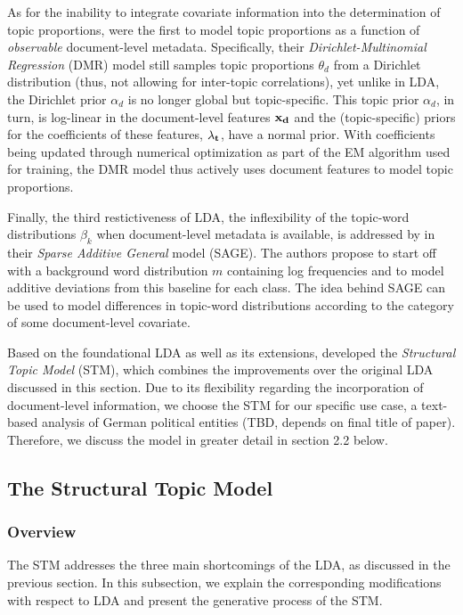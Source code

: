 \documentclass[12pt]{article}
\begin{document}
As for the inability to integrate covariate information into the determination of topic proportions, \cite{mimno2011optimizing} were the first to model topic proportions as a function of \textit{observable} document-level metadata. Specifically, their \textit{Dirichlet-Multinomial Regression} (DMR) model still samples topic proportions $\theta_d$ from a Dirichlet distribution (thus, not allowing for inter-topic correlations), yet unlike in LDA, the Dirichlet prior $\alpha_d$ is no longer global but topic-specific. This topic prior $\alpha_d$, in turn, is log-linear in the document-level features $\bf{x_d}$ and the (topic-specific) priors for the coefficients of these features, $\bf{\lambda_t}$, have a normal prior. With coefficients being updated through numerical optimization as part of the EM algorithm used for training, the DMR model thus actively uses document features to model topic proportions. 

Finally, the third restictiveness of LDA, the inflexibility of the topic-word distributions $\beta_k$ when document-level metadata is available, is addressed by \cite{eisenstein2011sparse} in their \textit{Sparse Additive General} model (SAGE). The authors propose to start off with a background word distribution $m$ containing log frequencies and to model additive deviations from this baseline for each class. The idea behind SAGE can be used to model differences in topic-word distributions according to the category of some document-level covariate.

Based on the foundational LDA as well as its extensions, \cite{roberts2013structural} developed the \textit{Structural Topic Model} (STM), which combines the improvements over the original LDA discussed in this section. Due to its flexibility regarding the incorporation of document-level information, we choose the STM for our specific use case, a text-based analysis of German political entities (TBD, depends on final title of paper). Therefore, we discuss the model in greater detail in section 2.2 below.

\subsection{The Structural Topic Model}

\subsubsection*{Overview}

The STM addresses the three main shortcomings of the LDA, as discussed in the previous section. In this subsection, we explain the corresponding modifications with respect to LDA and present the generative process of the STM.
\end{document}
